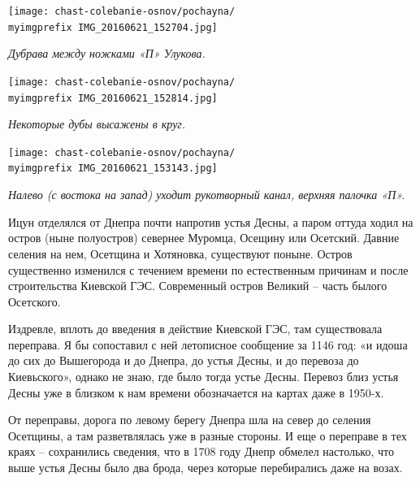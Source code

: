 \begin{center}
\texttt{[image: chast-colebanie-osnov/pochayna/\\myimgprefix IMG\_20160621\_152704.jpg]}

\textit{Дубрава между ножками «П» Улукова.}
\end{center}

\newpage
  
\begin{center}
\texttt{[image: chast-colebanie-osnov/pochayna/\\myimgprefix IMG\_20160621\_152814.jpg]}

\textit{Некоторые дубы высажены в круг.}
\end{center}
 
\begin{center}
\texttt{[image: chast-colebanie-osnov/pochayna/\\myimgprefix IMG\_20160621\_153143.jpg]}

\textit{Налево (с востока на запад) уходит рукотворный канал, верхняя палочка «П».}
\end{center}















Ицун отделялся от Днепра почти напротив устья Десны, а паром оттуда ходил на остров (ныне полуостров) севернее Муромца, Осещину или Осетский. Давние селения на нем, Осетщина и Хотяновка, существуют поныне. Остров существенно изменился с течением времени по естественным причинам и после строительства Киевской ГЭС. Современный остров Великий – часть былого Осетского.

Издревле, вплоть до введения в действие Киевской ГЭС, там существовала переправа. Я бы сопоставил с ней летописное сообщение за 1146 год: «и идоша до сих до Вышегорода и до Днепра, до устья Десны, и до перевоза до Киевьского», однако не знаю, где было тогда устье Десны. Перевоз близ устья Десны уже в близком к нам времени обозначается на картах даже в 1950-х.

От переправы, дорога по левому берегу Днепра шла на север до селения Осетщины, а там разветвлялась уже в разные стороны. И еще о переправе в тех краях – сохранились сведения, что в 1708 году Днепр обмелел настолько, что выше устья Десны было два брода, через которые перебирались даже на возах.




























